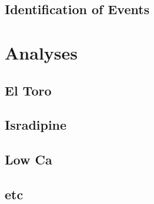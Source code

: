 \documentclass[a4paper,11pt,oneside,]{article}
\begin{document}
\subsection{Identification of Events}

\newpage

\section{Analyses}
\subsection{El Toro}
\subsection{Isradipine}
\subsection{Low Ca}
\subsection{etc}


\end{document}
